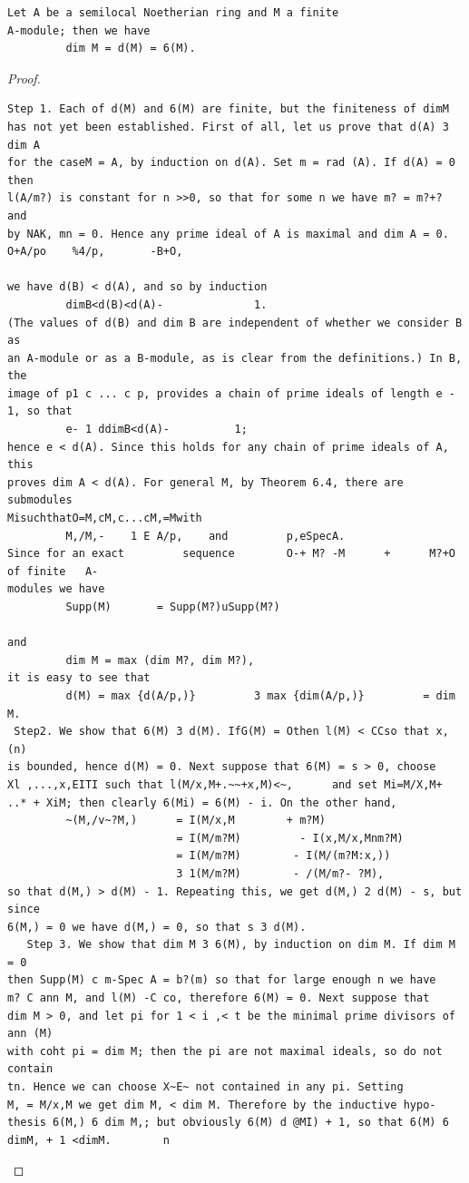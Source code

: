 \begin{theorem}\label{mcrt-auto-theorem-13-4}\uses{}
\begin{verbatim}
Let A be a semilocal Noetherian ring and M a finite
A-module; then we have
         dim M = d(M) = 6(M).
\end{verbatim}
\end{theorem}
\begin{proof}
\begin{verbatim}
Step 1. Each of d(M) and 6(M) are finite, but the finiteness of dimM
has not yet been established. First of all, let us prove that d(A) 3 dim A
for the caseM = A, by induction on d(A). Set m = rad (A). If d(A) = 0 then
l(A/m?) is constant for n >>0, so that for some n we have m? = m?+? and
by NAK, mn = 0. Hence any prime ideal of A is maximal and dim A = 0.
O+A/po    %4/p,       -B+O,

we have d(B) < d(A), and so by induction
         dimB<d(B)<d(A)-              1.
(The values of d(B) and dim B are independent of whether we consider B as
an A-module or as a B-module, as is clear from the definitions.) In B, the
image of p1 c ... c p, provides a chain of prime ideals of length e - 1, so that
         e- 1 ddimB<d(A)-          1;
hence e < d(A). Since this holds for any chain of prime ideals of A, this
proves dim A < d(A). For general M, by Theorem 6.4, there are submodules
MisuchthatO=M,cM,c...cM,=Mwith
         M,/M,-    1 E A/p,    and         p,eSpecA.
Since for an exact         sequence        O-+ M? -M      +      M?+O      of finite   A-
modules we have
         Supp(M)       = Supp(M?)uSupp(M?)

and
         dim M = max (dim M?, dim M?),
it is easy to see that
         d(M) = max {d(A/p,)}         3 max {dim(A/p,)}         = dim M.
 Step2. We show that 6(M) 3 d(M). IfG(M) = Othen l(M) < CCso that x,(n)
is bounded, hence d(M) = 0. Next suppose that 6(M) = s > 0, choose
Xl ,...,x,EITI such that l(M/x,M+.~~+x,M)<~,      and set Mi=M/X,M+
..* + XiM; then clearly 6(Mi) = 6(M) - i. On the other hand,
         ~(M,/v~?M,)      = I(M/x,M        + m?M)
                          = I(M/m?M)         - I(x,M/x,Mnm?M)
                          = I(M/m?M)        - I(M/(m?M:x,))
                          3 1(M/m?M)        - /(M/m?- ?M),
so that d(M,) > d(M) - 1. Repeating this, we get d(M,) 2 d(M) - s, but since
6(M,) = 0 we have d(M,) = 0, so that s 3 d(M).
   Step 3. We show that dim M 3 6(M), by induction on dim M. If dim M = 0
then Supp(M) c m-Spec A = b?(m) so that for large enough n we have
m? C ann M, and l(M) -C co, therefore 6(M) = 0. Next suppose that
dim M > 0, and let pi for 1 < i ,< t be the minimal prime divisors of ann (M)
with coht pi = dim M; then the pi are not maximal ideals, so do not contain
tn. Hence we can choose X~E~ not contained in any pi. Setting
M, = M/x,M we get dim M, < dim M. Therefore by the inductive hypo-
thesis 6(M,) 6 dim M,; but obviously 6(M) d @MI) + 1, so that 6(M) 6
dimM, + 1 <dimM.        n
\end{verbatim}
\end{proof}


